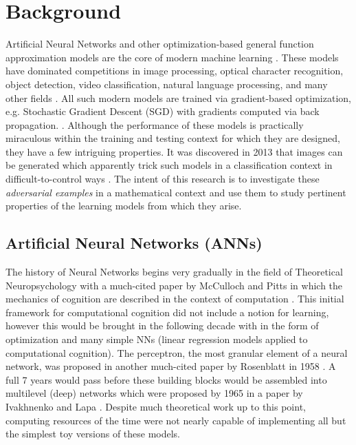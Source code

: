 
\section{Background}

Artificial Neural Networks and other optimization-based general
function approximation models are the core of modern
machine learning \cite{prakash2018}. These models have dominated competitions in image processing, optical character recognition, object detection, video classification, natural language processing, and many other fields \cite{SCHMIDHUBER201585}. All such modern models are
trained via gradient-based optimization, e.g. Stochastic Gradient Descent (SGD) with
gradients computed via back propagation. \cite{goodfellow2013multidigit}. Although the performance of these models is practically
miraculous within the training and testing context for which they are designed, they have a few intriguing properties. It was discovered in 2013 
\cite{Szegedy2013} that images can be generated
which apparently trick such models in a classification context in  difficult-to-control ways \cite{Khoury2018}. The intent of this
research is to investigate these \emph{adversarial examples} in a
mathematical context and use them to study pertinent 
properties of the learning models from which they arise.

\subsection{Artificial Neural Networks (ANNs)}


The history of Neural Networks begins very gradually in the field of Theoretical
Neuropsychology with a much-cited paper by McCulloch and Pitts in
which the mechanics of cognition are described in the context of
computation \cite{mcculloch1943logical}. This initial framework for
computational cognition did not include a notion for learning, however
this would be brought in the following decade with in the form of
optimization and many simple NNs (linear regression models applied to
computational cognition). The perceptron, the most granular element of
a neural network, was proposed in another much-cited paper by
Rosenblatt in 1958 \cite{rosenblatt1958perceptron}. A full 7 years
would pass before these building blocks would be assembled into
multilevel (deep) networks which were proposed by 1965 in a paper by
Ivakhnenko and Lapa \cite{ivakhnenko1965cybernetic}. Despite much
theoretical work up to this point, computing resources of the time
were not nearly capable of implementing all but the simplest toy
versions of these models. 

